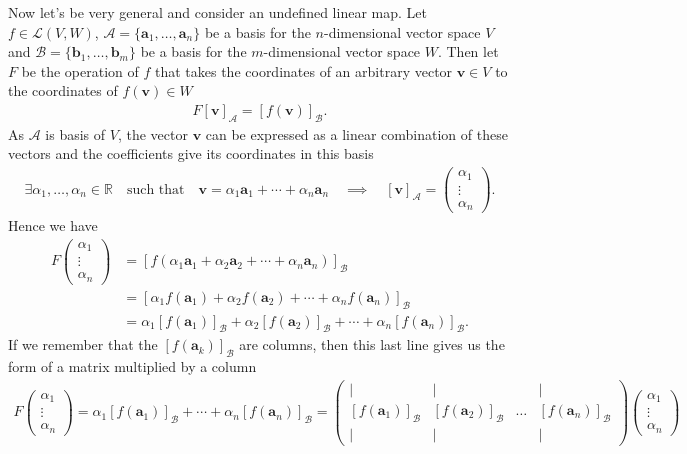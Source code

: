 \noindent Now let's be very general and consider an undefined linear map. Let $f\in \mathcal{L}(V,W)$, $\mathcal{A}=\{ \mathbf{a}_1, \dots , \mathbf{a}_n\}$ be a basis for the $n$-dimensional vector space $V$ and $\mathcal{B}=\{ \mathbf{b}_1, \dots , \mathbf{b}_m\}$ be a basis for the $m$-dimensional vector space $W$. Then let $F$ be the operation of $f$ that takes the coordinates of an arbitrary vector $\mathbf{v}\in V$ to the coordinates of $f(\mathbf{v}) \in W$
\begin{align*}
F[\mathbf{v}]_\mathcal{A} = [f(\mathbf{v})]_\mathcal{B}.
\end{align*}
As $\mathcal{A}$ is basis of $V$, the vector $\mathbf{v}$ can be expressed as a linear combination of these vectors and the coefficients give its coordinates in this basis
\begin{align*}
\exists \alpha_1, \dots, \alpha_n \in \mathbb{R}\quad\text{such that} \quad \mathbf{v} = \alpha_1 \mathbf{a}_1 + \cdots + \alpha_n \mathbf{a}_n \quad\implies\quad [\mathbf{v}]_\mathcal{A} = 
\begin{pmatrix}
\alpha_1 \\ \vdots \\ \alpha_n
\end{pmatrix}.
\end{align*}
Hence we have
\begin{align*}
F
\begin{pmatrix}
\alpha_1 \\ \vdots \\ \alpha_n
\end{pmatrix}
%
&=[f(\alpha_1 \mathbf{a}_1 + \alpha_2 \mathbf{a}_2 + \cdots + \alpha_n \mathbf{a}_n)]_\mathcal{B} \\
%
&= [\alpha_1 f(\mathbf{a}_1) + \alpha_2  f(\mathbf{a}_2) + \cdots + \alpha_n f(\mathbf{a}_n)]_\mathcal{B}  \\
%
&= \alpha_1 [f(\mathbf{a}_1)]_\mathcal{B}  + \alpha_2 [f(\mathbf{a}_2)]_\mathcal{B} + \cdots + \alpha_n [f(\mathbf{a}_n)]_\mathcal{B} .
\end{align*}
If we remember that the $[f(\mathbf{a}_k)]_\mathcal{B}$ are columns, then this last line gives us the form  of a matrix multiplied by a column
\begin{align*}
F
\begin{pmatrix}
\alpha_1 \\ \vdots \\ \alpha_n
\end{pmatrix}
=
\alpha_1 [f(\mathbf{a}_1)]_\mathcal{B}  + \cdots + \alpha_n [f(\mathbf{a}_n)]_\mathcal{B} = 
\begin{pmatrix}
| & | & & | \\
[f(\mathbf{a}_1)]_\mathcal{B} & [f(\mathbf{a}_2)]_\mathcal{B} & \dots & [f(\mathbf{a}_n)]_\mathcal{B}\\
| & | & & | 
\end{pmatrix}
\begin{pmatrix}
\alpha_1 \\ \vdots \\ \alpha_n
\end{pmatrix}
\end{align*}

